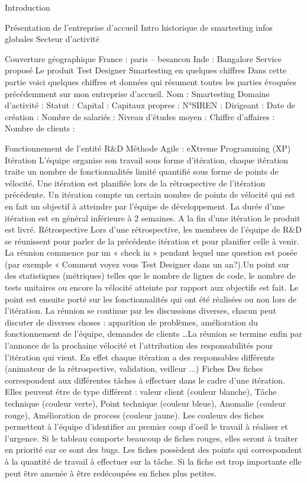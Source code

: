 Introduction

Présentation de l'entreprise d'accueil
Intro historique de smartesting infos globales
Secteur d'activité

Couverture géographique
France : paris – besancon
Inde : Bangalore
Service proposé
Le produit Test Designer
Smartesting en quelques chiffres
Dans cette partie voici quelques chiffres et données qui résument toutes les parties évoquées précédemment sur mon entreprise d'accueil.
Nom : Smartesting
Domaine d'activité : 
Statut : 
Capital : 
Capitaux propres : 
N°SIREN : 
Dirigeant :
Date de création : 
Nombre de salariés :
Niveau d'études moyen :
Chiffre d'affaires :
Nombre de clients :

Fonctionnement de l'entité R&D
Méthode Agile : eXtreme Programming  (XP)
Itération
L'équipe organise son travail sous forme d'itération, chaque itération traite un nombre de fonctionnalités limité quantifié sous forme de points de vélocité. Une itération est planifiée lors de la rétrospective de l'itération précédente. Un itération compte un certain nombre de points de vélocité qui est en fait un objectif à atteindre par l'équipe de développement. La durée d'une itération est en général inférieure à 2 semaines. A la fin d'une itération le produit est livré.
Rétrospective
Lors d'une rétrospective,  les membres de l'équipe de R&D se réunissent pour parler de la précédente itération et pour planifier celle à venir. La réunion commence par un « check in » pendant lequel une question est posée (par exemple « Comment voyez vous Test Designer dans un an?).Un point sur des statistiques (métriques) telles que le nombre de lignes de code, le nombre de tests unitaires ou encore la vélocité atteinte par rapport aux objectifs est fait. Le point est ensuite porté sur les fonctionnalités qui ont été réalisées ou non lors de l'itération. La réunion se continue par les discussions diverses, chacun peut discuter de diverses choses : apparition de problèmes, amélioration du fonctionnement de l'équipe, demandes de clients …La réunion se termine enfin par l'annonce de la prochaine vélocité et l'attribution des responsabilités pour l'itération qui vient. En effet chaque itération a des responsables différents (animateur de la rétrospective, validation, veilleur ...)
Fiches
Des fiches correspondent aux différentes tâches à effectuer dans le cadre d'une itération. Elles peuvent être de type différent : valeur client (couleur blanche), Tâche technique (couleur verte), Point technique (couleur bleue), Anomalie (couleur rouge), Amélioration de process (couleur jaune). Les couleurs des fiches permettent à l'équipe d'identifier au premier coup d'oeil le travail à réaliser et l'urgence. Si le tableau comporte beaucoup de fiches rouges, elles seront à traiter en priorité car ce sont des bugs. Les fiches possèdent des points qui correspondent à la quantité de travail à effectuer sur la tâche. Si la fiche est trop importante elle peut être amenée à être redécoupées en fiches plus petites.

